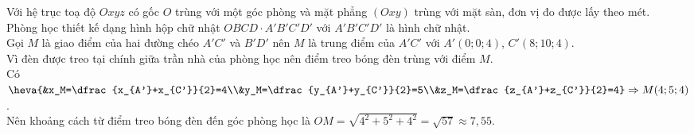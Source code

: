 \begin{bt}
{\begin{center}
		 \end{center}
		Với hệ trục toạ độ $Oxyz$ có gốc $O$ trùng với một góc phòng và mặt phẳng $(Oxy)$ trùng với mặt sàn, đơn vị đo được lấy theo mét.\\
		Phòng học thiết kế dạng hình hộp chữ nhật $OBCD\cdot A'B'C'D'$ với $A'B'C'D'$ là hình chữ nhật.\\
		Gọi $M$ là giao điểm của hai đường chéo $A'C'$ và $B'D'$ nên $M$ là trung điểm của $A'C'$ với $A'(0;0;4)$, $C'(8;10;4)$.\\
		Vì đèn được treo tại chính giữa trần nhà của phòng học nên điểm treo bóng đèn trùng với điểm $M$.\\
		Có $\heva{&x_M=\dfrac{x_{A'}+x_{C'}}{2}=4\\&y_M=\dfrac{y_{A'}+y_{C'}}{2}=5\\&z_M=\dfrac{z_{A'}+z_{C'}}{2}=4}\Rightarrow M(4;5;4)$.\\
		Nên khoảng cách từ điểm treo bóng đèn đến góc phòng học là $OM=\sqrt{4^2+5^2+4^2}=\sqrt{57}\approx7{,}55$.}
\end{bt}

